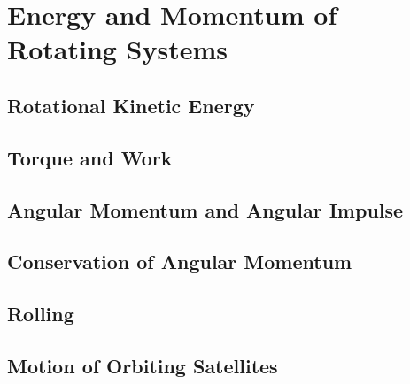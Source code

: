 \documentclass[../mech.tex]{subfiles}
\begin{document}
\chapter{Energy and Momentum of Rotating Systems}
\section{Rotational Kinetic Energy}
\section{Torque and Work}
\section{Angular Momentum and Angular Impulse}
\section{Conservation of Angular Momentum}
\section{Rolling}
\section{Motion of Orbiting Satellites}
\end{document}
